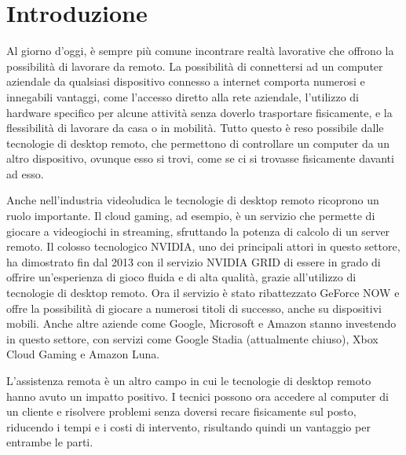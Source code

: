 \documentclass[12pt,a4paper,openright,twoside]{book}
\begin{document}
\chapter{Introduzione}
\label{chap:introduction}

Al giorno d'oggi, è sempre più comune incontrare realtà lavorative che offrono la possibilità di lavorare da remoto.
%
La possibilità di connettersi ad un computer aziendale da qualsiasi dispositivo connesso a internet comporta numerosi e innegabili vantaggi,
come l'accesso diretto alla rete aziendale,
l'utilizzo di hardware specifico per alcune attività senza doverlo trasportare fisicamente,
e la flessibilità di lavorare da casa o in mobilità.
%
Tutto questo è reso possibile dalle tecnologie di desktop remoto, che permettono di controllare un computer da un altro dispositivo, ovunque esso si trovi, come se ci si trovasse fisicamente davanti ad esso.

Anche nell'industria videoludica le tecnologie di desktop remoto ricoprono un ruolo importante.
%
Il cloud gaming,
ad esempio, è un servizio che permette di giocare a videogiochi in streaming,
sfruttando la potenza di calcolo di un server remoto.
%
Il colosso tecnologico NVIDIA,
uno dei principali attori in questo settore,
ha dimostrato fin dal 2013 con il servizio NVIDIA GRID di essere in grado di offrire un'esperienza di gioco fluida e di alta qualità,
grazie all'utilizzo di tecnologie di desktop remoto.
%
Ora il servizio è stato ribattezzato GeForce NOW e offre la possibilità di giocare a numerosi titoli di successo,
anche su dispositivi mobili.
%
Anche altre aziende come Google,
Microsoft e Amazon stanno investendo in questo settore,
con servizi come Google Stadia (attualmente chiuso),
Xbox Cloud Gaming e Amazon Luna.

L'assistenza remota è un altro campo in cui le tecnologie di desktop remoto hanno avuto un impatto positivo.
%
I tecnici possono ora accedere al computer di un cliente e risolvere problemi senza doversi recare fisicamente sul posto,
riducendo i tempi e i costi di intervento,
risultando quindi un vantaggio per entrambe le parti.
\end{document}
